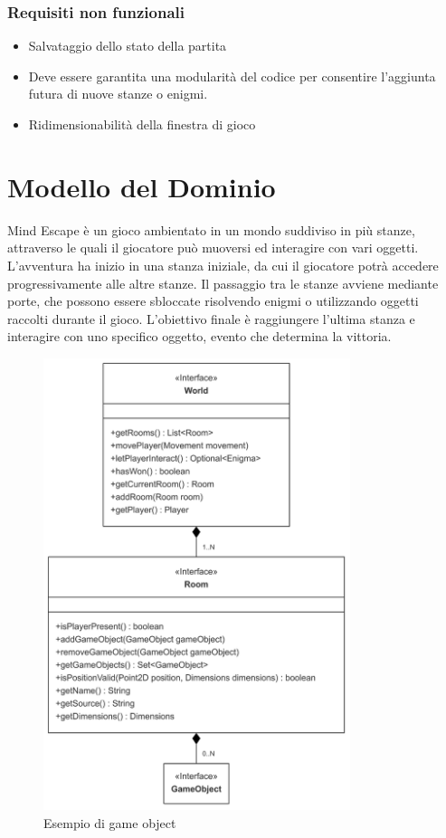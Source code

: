 \documentclass[a4paper,12pt]{report}
\begin{document}
\subsubsection{Requisiti non funzionali}
\begin{itemize}
	\item Salvataggio dello stato della partita
	\item Deve essere garantita una modularità del codice per consentire l'aggiunta futura di nuove stanze o enigmi.
	\item Ridimensionabilità della finestra di gioco
\end{itemize}

\section{Modello del Dominio}

Mind Escape è un gioco ambientato in un mondo suddiviso in più stanze, attraverso le quali il giocatore può muoversi ed interagire con vari oggetti. 
L’avventura ha inizio in una stanza iniziale, da cui il giocatore potrà accedere progressivamente alle altre stanze. 
Il passaggio tra le stanze avviene mediante porte, che possono essere sbloccate risolvendo enigmi o utilizzando oggetti raccolti durante il gioco. L'obiettivo finale è raggiungere l’ultima stanza e interagire con uno specifico oggetto, evento che determina la vittoria.

\begin{figure}[h]  %
    \centering
    \includegraphics[width=0.8\textwidth]{img/model.png}  %
    \caption{Esempio di game object}
    \label{img:gameObject}
\end{figure}
\end{document}
